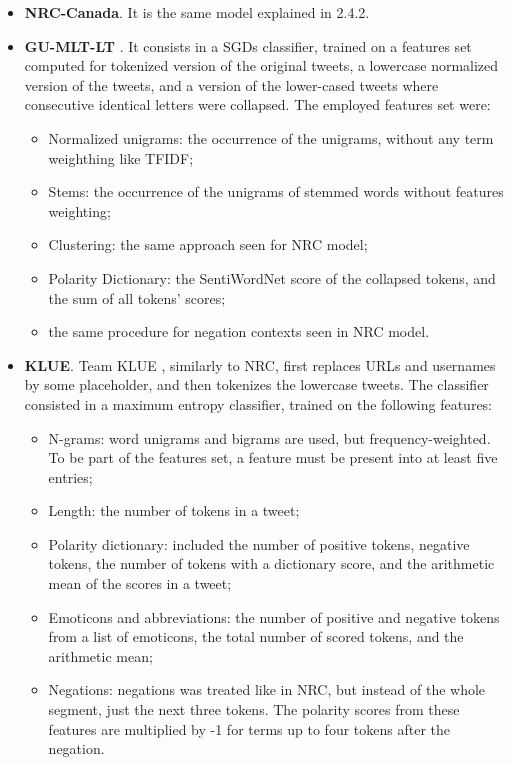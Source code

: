 \begin{itemize}
	\item \textbf{NRC-Canada}. It is the same model explained in 2.4.2.
	\item \textbf{GU-MLT-LT} \cite{gunther-furrer-2013-gu}. It consists in a \aclp{SGD} classifier, trained on a features set computed for tokenized version of the original tweets, a lowercase normalized version of the tweets, and a version of the lower-cased tweets where consecutive identical letters were collapsed. The employed features set were:
	\begin{itemize}
		\item Normalized unigrams: the occurrence of the unigrams, without any term weighthing like \ac{TFIDF};
		\item Stems: the occurrence of the unigrams of stemmed words without features weighting;
		\item Clustering: the same approach seen for NRC model;
		\item Polarity Dictionary: the SentiWordNet score of the collapsed tokens, and the sum of all tokens' scores;
		\item the same procedure for negation contexts seen in NRC model.
	\end{itemize}
	\item \textbf{KLUE}. Team KLUE \cite{klue}, similarly to NRC, first replaces URLs and usernames by some placeholder, and then tokenizes the lowercase tweets. The classifier consisted in a maximum entropy classifier, trained on the following features:
	\begin{itemize}
		\item N-grams: word unigrams and bigrams are used, but frequency-weighted. To be part of the features set, a feature must be present into at least five entries;
		\item Length: the number of tokens in a tweet;
		\item Polarity dictionary: included the number of positive tokens, negative tokens, the number of tokens with a dictionary score, and the arithmetic mean of the scores in a tweet;
		\item Emoticons and abbreviations: the number of positive and negative tokens from a list of emoticons, the total number of scored tokens, and the arithmetic mean;
		\item Negations: negations was treated like in NRC, but instead of the whole segment, just the next three tokens. The polarity scores from these features are multiplied by -1 for terms up to four tokens after the negation.
	\end{itemize}
	

\end{itemize}
